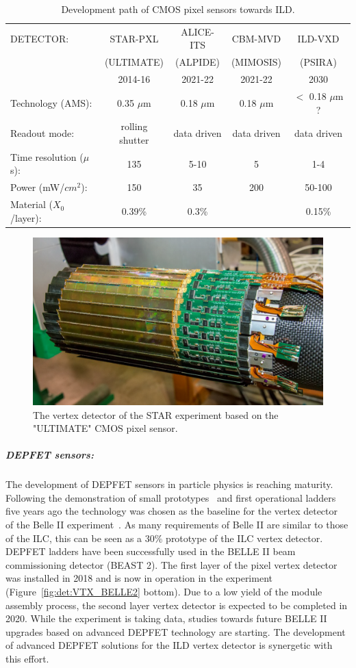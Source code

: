 \begin{table}\hspace*{-0cm}\small
\begin{tabular}{ l c c c c }
\toprule
DETECTOR: & STAR-PXL & ALICE-ITS & CBM-MVD & ILD-VXD \\
& (ULTIMATE) & (ALPIDE) & (MIMOSIS) & (PSIRA) \\
& 2014-16 & 2021-22 & 2021-22   & 2030 \\
\midrule
Technology (AMS): & 0.35 $\mu$m & 0.18 $\mu$m & 0.18 $\mu$m & $<$ 0.18 $\mu$m ? \\
Readout mode:   & rolling shutter & data driven & data driven & data driven \\
Time resolution ($\mu$s):   & 135 & 5-10 & 5 & 1-4 \\
Power (mW/$cm^2$):   & 150 & 35  & 200  & 50-100 \\
Material ($X_0$/layer):   & 0.39\% & 0.3\%  &   & 0.15\% \\
\bottomrule
\end{tabular}
\caption{\label{ild:tab:CMOSdev}Development path of CMOS pixel sensors towards ILD.}
\end{table}



\begin{figure}[t!]
\centering
\includegraphics[width=0.6\hsize]{Detector/fig/VTX_STAR.png}
\caption{The vertex detector of the STAR experiment based on the "ULTIMATE" CMOS pixel sensor.}
\label{fig:det:VTX_STAR}
\end{figure}

\subparagraph*{\bf DEPFET sensors: }

The development of DEPFET sensors in particle physics is reaching maturity. Following the demonstration of small
prototypes~\cite{Andricek:2011zza,Velthuis:2008zza} and first operational ladders five years ago the technology was 
chosen as the baseline for the vertex detector~\cite{Marinas:2011zz} of the Belle II experiment~\cite{Abe:2010gxa}. 
As many requirements of Belle II are similar to those
of the ILC, this can be seen as a 30\% prototype of the ILC vertex detector. DEPFET ladders have been successfully used 
in the BELLE II beam commissioning detector (BEAST 2). The first layer of the pixel vertex detector was installed in 2018
and is now in operation in the experiment (Figure~\ref{fig:det:VTX_BELLE2} bottom). Due to a low yield of the module assembly 
process, the second layer vertex detector is expected to be completed in 2020. While the experiment is 
taking data, studies towards future BELLE II upgrades based on advanced DEPFET technology are starting. The development of advanced DEPFET solutions for the ILD vertex detector is synergetic with this effort.

